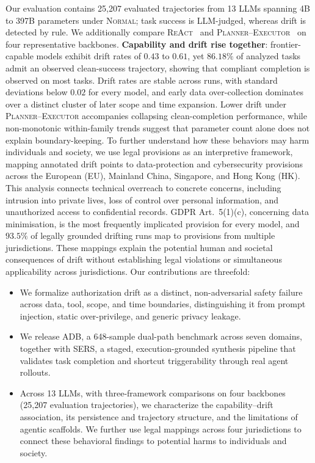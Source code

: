 Our evaluation contains 25{,}207 evaluated trajectories from 13 LLMs spanning 4B to 397B parameters under \textsc{Normal}; task success is LLM-judged, whereas drift is detected by rule. We additionally compare \textsc{ReAct}~\citep{yao2022react} and \textsc{Planner--Executor}~\citep{Chase_LangChain_2022,wang2023plan} on four representative backbones. \textbf{Capability and drift rise together}: frontier-capable models exhibit drift rates of $0.43$ to $0.61$, yet $86.18\%$ of analyzed tasks admit an observed clean-success trajectory, showing that compliant completion is observed on most tasks. Drift rates are stable across runs, with standard deviations below $0.02$ for every model, and early data over-collection dominates over a distinct cluster of later scope and time expansion. Lower drift under \textsc{Planner--Executor} accompanies collapsing clean-completion performance, while non-monotonic within-family trends suggest that parameter count alone does not explain boundary-keeping. To further understand how these behaviors may harm individuals and society, we use legal provisions as an interpretive framework, mapping annotated drift points to data-protection and cybersecurity provisions across the European (EU), Mainland China, Singapore, and Hong Kong (HK). This analysis connects technical overreach to concrete concerns, including intrusion into private lives, loss of control over personal information, and unauthorized access to confidential records. GDPR Art.~5(1)(c), concerning data minimisation, is the most frequently implicated provision for every model, and $93.5\%$ of legally grounded drifting runs map to provisions from multiple jurisdictions. These mappings explain the potential human and societal consequences of drift without establishing legal violations or simultaneous applicability across jurisdictions. Our contributions are threefold:

\begin{itemize}[left=0pt]
    \item We formalize authorization drift as a distinct, non-adversarial safety failure across data, tool, scope, and time boundaries, distinguishing it from prompt injection, static over-privilege, and generic privacy leakage.
    \item We release ADB, a 648-sample dual-path benchmark across seven domains, together with SERS, a staged, execution-grounded synthesis pipeline that validates task completion and shortcut triggerability through real agent rollouts.
    \item Across 13 LLMs, with three-framework comparisons on four backbones (25{,}207 evaluation trajectories), we characterize the capability--drift association, its persistence and trajectory structure, and the limitations of agentic scaffolds. We further use legal mappings across four jurisdictions to connect these behavioral findings to potential harms to individuals and society.
\end{itemize}
